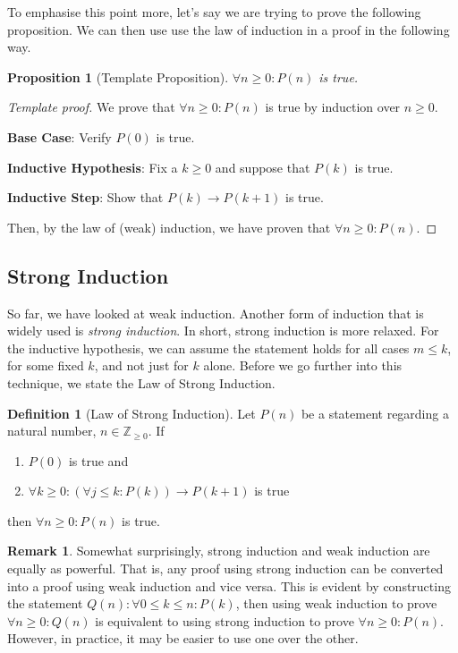 \documentclass{article}
\newcommand{\ra}{\rightarrow}
\newcommand{\ZZ}{\mathbb{Z}_{\geq 0}}
\theoremstyle{plain}
\newtheorem*{proposition*}{Proposition}
\theoremstyle{definition}
\newtheorem{definition}{Definition}
\newtheorem{remark}{Remark}
\begin{document}
To emphasise this point more, let's say we are trying to prove the following proposition. We can then use use the law of induction in a proof in the following way.

\begin{proposition*}[Template Proposition]
    \(\forall n \geq 0 : P(n)\) is true.
\end{proposition*}
\begin{proof}[Template proof]
    We prove that \(\forall n \geq 0 : P(n)\) is true by induction over \(n \geq 0\).
    
    \textbf{Base Case}: Verify \(P(0)\) is true.

    \textbf{Inductive Hypothesis}: Fix a \(k \geq 0\) and suppose that \(P(k)\) is true.

    \textbf{Inductive Step}: Show that \(P(k) \ra P(k+1)\) is true.

    Then, by the law of (weak) induction, we have proven that \(\forall n \geq 0 : P(n)\).
\end{proof}
 
\subsection{Strong Induction}

So far, we have looked at weak induction. Another form of induction that is widely used is \emph{strong induction}. In short, strong induction is more relaxed. For the inductive hypothesis, we can assume the statement holds for all cases \(m \leq k\), for some fixed \(k\), and not just for \(k\) alone. Before we go further into this technique, we state the Law of Strong Induction.

\begin{definition}[Law of Strong Induction]
    Let \(P(n)\) be a statement regarding a natural number, \(n \in \ZZ\). If
    \begin{enumerate}
        \item \(P(0)\) is true and
        \item \(\forall k \geq 0 : (\forall j \leq k :  P(k)) \ra P(k+1)\) is true
    \end{enumerate}    
    then \(\forall n \geq 0 : P(n)\) is true.
\end{definition}

\begin{remark}
Somewhat surprisingly, strong induction and weak induction are equally as powerful. That is, any proof using strong induction can be converted into a proof using weak induction and vice versa. This is evident by constructing the statement \(Q(n): \forall 0 \leq k \leq n : P(k)\), then using weak induction to prove \(\forall n \geq 0 : Q(n)\) is equivalent to using strong induction to prove \(\forall n \geq 0 : P(n)\). However, in practice, it may be easier to use one over the other.
\end{remark}
\end{document}
